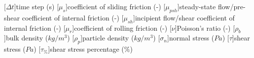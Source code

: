 \begin{multicols}{2}
\begin{acronym}[FOOBAR]
	
	[$\Delta t$]{time step (s)}
	[$\mu_s$]{coefficient of sliding friction (-)}
	[$\mu_{psh}$]{steady-state flow/pre-shear coefficient of internal
	friction (-)} 
	[$\mu_{sh}$]{incipient flow/shear coefficient of internal
	friction (-)}
	[$\mu_r$]{coefficient of rolling friction (-)}
	[$\nu$]{Poisson's ratio (-)}
	[$\rho_b$]{bulk density ($kg/m^3$)}
	[$\rho_p$]{particle density ($kg/m^3$)}
	[$\sigma_n$]{normal stress ($Pa$)}
	[$\tau$]{shear stress ($Pa$)}
	[$\tau_{\%}$]{shear stress percentage ($\%$)}
	
	

% 	
\end{acronym}
\end{multicols}
